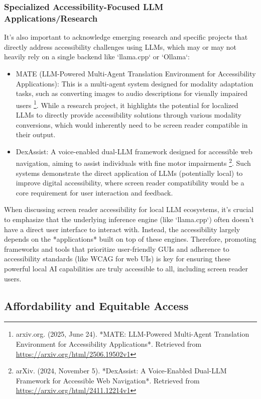 \subsubsection{Specialized Accessibility-Focused LLM Applications/Research}
It's also important to acknowledge emerging research and specific projects that directly address accessibility challenges using LLMs, which may or may not heavily rely on a single backend like `llama.cpp` or `Ollama`:
\begin{itemize}
    \item MATE (LLM-Powered Multi-Agent Translation Environment for Accessibility Applications): This is a multi-agent system designed for modality adaptation tasks, such as converting images to audio descriptions for visually impaired users \footnote{arxiv.org. (2025, June 24). *MATE: LLM-Powered Multi-Agent Translation Environment for Accessibility Applications*. Retrieved from \url{https://arxiv.org/html/2506.19502v1}}. While a research project, it highlights the potential for localized LLMs to directly provide accessibility solutions through various modality conversions, which would inherently need to be screen reader compatible in their output.
    \item DexAssist: A voice-enabled dual-LLM framework designed for accessible web navigation, aiming to assist individuals with fine motor impairments \footnote{arXiv. (2024, November 5). *DexAssist: A Voice-Enabled Dual-LLM Framework for Accessible Web Navigation*. Retrieved from \url{https://arxiv.org/html/2411.12214v1}}. Such systems demonstrate the direct application of LLMs (potentially local) to improve digital accessibility, where screen reader compatibility would be a core requirement for user interaction and feedback.
\end{itemize}

When discussing screen reader accessibility for local LLM ecosystems, it's crucial to emphasize that the underlying inference engine (like `llama.cpp`) often doesn't have a direct user interface to interact with. Instead, the accessibility largely depends on the *applications* built on top of these engines. Therefore, promoting frameworks and tools that prioritize user-friendly GUIs and adherence to accessibility standards (like WCAG for web UIs) is key for ensuring these powerful local AI capabilities are truly accessible to all, including screen reader users.
\subsection{Affordability and Equitable Access}

